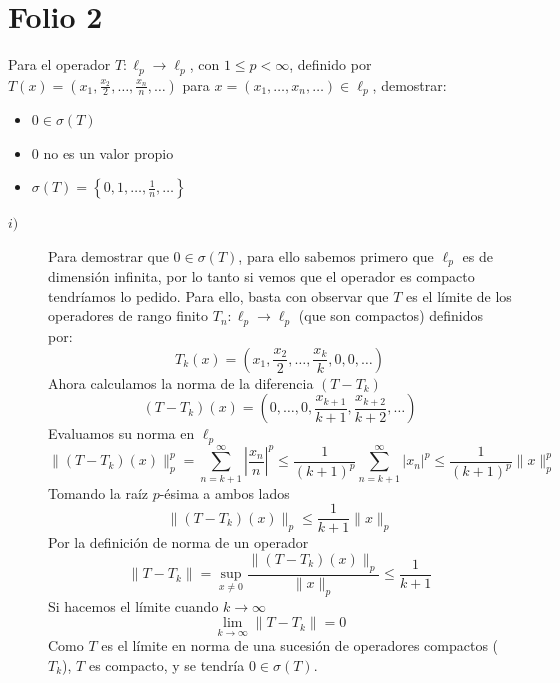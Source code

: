 \section{Folio 2}

\begin{ejercicio}
    Para el operador $T: \ell_p \longrightarrow \ell_p$, con $1 \leq p < \infty$, definido por \\
    $T(x) = \left( x_1, \frac{x_2}{2}, \dots, \frac{x_n}{n}, \dots \right)$ para $x = (x_1, \dots, x_n, \dots) \in \ell_p$, demostrar:
    \begin{itemize}
        \item[(i)] $0 \in \sigma(T)$
        \item[(ii)] $0$ no es un valor propio
        \item[(iii)] $\sigma(T) = \left\{ 0, 1, \dots, \frac{1}{n}, \dots \right\}$
    \end{itemize}
    \begin{description}
        \item[$i)$] Para demostrar que $0 \in \sigma(T)$, para ello sabemos primero que $\ell_p$ es de dimensión infinita, por lo tanto si vemos que el operador es compacto tendríamos lo pedido. Para ello, basta con observar que $T$ es el límite de los operadores de rango finito $T_n: \ell_p \longrightarrow \ell_p$ (que son compactos) definidos por:
        $$T_k(x) = \left( x_1, \frac{x_2}{2}, \dots, \frac{x_k}{k}, 0, 0, \dots \right)$$
        Ahora calculamos la norma de la diferencia $(T - T_k)$
        $$(T - T_k)(x) = \left( 0, \dots, 0, \frac{x_{k+1}}{k+1}, \frac{x_{k+2}}{k+2}, \dots \right)$$
        Evaluamos su norma en $\ell_p$
        $$\|(T - T_k)(x)\|_p^p = \sum_{n=k+1}^{\infty} \left| \frac{x_n}{n} \right|^p \leq \frac{1}{(k+1)^p} \sum_{n=k+1}^{\infty} |x_n|^p \leq \frac{1}{(k+1)^p} \|x\|_p^p$$
        Tomando la raíz $p$-ésima a ambos lados
        $$\|(T - T_k)(x)\|_p \leq \frac{1}{k+1} \|x\|_p$$
        Por la definición de norma de un operador
        $$\|T - T_k\| = \sup_{x \neq 0} \frac{\|(T - T_k)(x)\|_p}{\|x\|_p} \leq \frac{1}{k+1}$$
        Si hacemos el límite cuando $k \to \infty$
        $$\lim_{k \to \infty} \|T - T_k\| = 0$$
        Como $T$ es el límite en norma de una sucesión de operadores compactos ($T_k$), $T$ es compacto, y se tendría $0\in \sigma(T)$.


\end{description}
\end{ejercicio}
